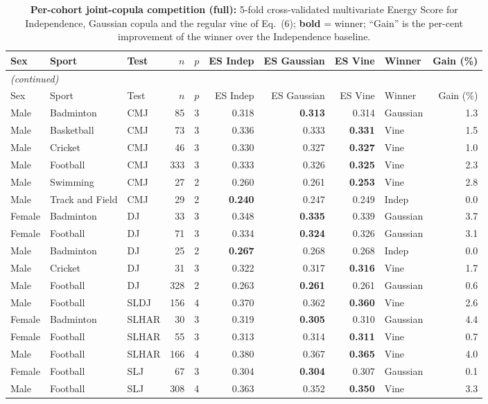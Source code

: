 {\small
\begin{longtable}{lllrrrrrlr}
\caption{\textbf{Per-cohort joint-copula competition (full):} 5-fold cross-validated multivariate Energy Score for Independence, Gaussian copula and the regular vine of Eq.~(6); \textbf{bold} = winner; ``Gain'' is the per-cent improvement of the winner over the Independence baseline.}\label{tab:joint_full}\\
\toprule
Sex & Sport & Test & $n$ & $p$ & ES Indep & ES Gaussian & ES Vine & Winner & Gain (\%) \\
\midrule
\endfirsthead
\multicolumn{10}{l}{\emph{(continued)}} \\
\toprule
Sex & Sport & Test & $n$ & $p$ & ES Indep & ES Gaussian & ES Vine & Winner & Gain (\%) \\
\midrule
\endhead
\bottomrule
\endfoot
Male & Badminton & CMJ & 85 & 3 & 0.318 & \textbf{0.313} & 0.314 & Gaussian & 1.3 \\
Male & Basketball & CMJ & 73 & 3 & 0.336 & 0.333 & \textbf{0.331} & Vine & 1.5 \\
Male & Cricket & CMJ & 46 & 3 & 0.330 & 0.327 & \textbf{0.327} & Vine & 1.0 \\
Male & Football & CMJ & 333 & 3 & 0.333 & 0.326 & \textbf{0.325} & Vine & 2.3 \\
Male & Swimming & CMJ & 27 & 2 & 0.260 & 0.261 & \textbf{0.253} & Vine & 2.8 \\
Male & Track and Field & CMJ & 29 & 2 & \textbf{0.240} & 0.247 & 0.249 & Indep & 0.0 \\
Female & Badminton & DJ & 33 & 3 & 0.348 & \textbf{0.335} & 0.339 & Gaussian & 3.7 \\
Female & Football & DJ & 71 & 3 & 0.334 & \textbf{0.324} & 0.326 & Gaussian & 3.1 \\
Male & Badminton & DJ & 25 & 2 & \textbf{0.267} & 0.268 & 0.268 & Indep & 0.0 \\
Male & Cricket & DJ & 31 & 3 & 0.322 & 0.317 & \textbf{0.316} & Vine & 1.7 \\
Male & Football & DJ & 328 & 2 & 0.263 & \textbf{0.261} & 0.261 & Gaussian & 0.6 \\
Male & Football & SLDJ & 156 & 4 & 0.370 & 0.362 & \textbf{0.360} & Vine & 2.6 \\
Female & Badminton & SLHAR & 30 & 3 & 0.319 & \textbf{0.305} & 0.310 & Gaussian & 4.4 \\
Female & Football & SLHAR & 55 & 3 & 0.313 & 0.314 & \textbf{0.311} & Vine & 0.7 \\
Male & Football & SLHAR & 166 & 4 & 0.380 & 0.367 & \textbf{0.365} & Vine & 4.0 \\
Female & Football & SLJ & 67 & 3 & 0.304 & \textbf{0.304} & 0.307 & Gaussian & 0.1 \\
Male & Football & SLJ & 308 & 4 & 0.363 & 0.352 & \textbf{0.350} & Vine & 3.3 \\
\end{longtable}
}
